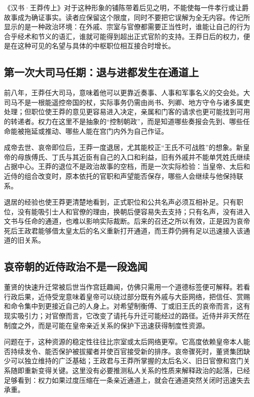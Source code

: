 《汉书·王莽传上》对于这种形象的铺陈带着后见之明，不能使每一件孝行或让爵故事成为确证事实。读者应保留这个限度，同时不要把它误解为全无内容。传记所显示的是一种政治环境：在外戚、宗室与官僚都需要正当性时，谁能让自己的行为合乎经术和节义的语汇，谁就可能得到超出正式官阶的支持。王莽日后的权力，便是在这种可见的名望与具体的中枢职位相互接合时增长。

\subsection{第一次大司马任期：退与进都发生在通道上}

前八年，王莽任大司马，意味着他可以更靠近奏事、人事和军事名义的交会处。大司马不是一根能遥控帝国的杖，实际事务仍需由尚书、列卿、地方守令与诸多属吏处理；但职位使王莽的意见更容易进入决定，亲属和门客的请求也更可能找到可用的转递者。权力在这里不是抽象的“控制朝政”，而是知道哪些奏报会先到、哪些任命能被拖延或推动、哪些人能在宫门内外为自己作证。

成帝去世、哀帝即位后，王莽一度退居，尤其能校正“王氏不可战胜”的想象。新皇帝的母族傅氏、丁氏与其近臣有自己的入口和利益，旧有外戚并不能单凭姓氏继续占据中心。王莽的退位不是政治故事的空档，而是一次实际检验：当皇帝、太后和近侍的组合改变时，原本依托的官职和声望能否保存，哪些人会继续与他保持联系。

退居的经验也使王莽更清楚地看到，正式职位和公共名声必须互相补足。只有职位，没有能吸引士人和官僚的理由，换朝后便容易失去支持；只有名声，没有进入文书与任命的通道，也难以影响实际裁断。后来的召还之所以有效，正是因为哀帝死后王政君能够借太皇太后的名义重新打开通道，而王莽仍拥有足以迅速接入该通道的旧关系。

\subsection{哀帝朝的近侍政治不是一段逸闻}

董贤的快速升迁常被后世当作宫廷趣闻，仿佛只需用一个道德标签便可解释。若看行政后果，近侍受宠意味着皇帝可以绕过部分既有外戚与大臣网络，把信任、赏赐和命令集中到更接近自己的人身上。对希望制衡傅、丁或旧王氏的哀帝而言，这有现实吸引力；对官僚而言，它改变了请托与升迁可能经过的路径。近侍并非天然在制度之外，而是可能在皇帝亲近关系的保护下迅速获得制度性资源。

问题在于，这种资源的稳定性往往比宗室或太后网络更窄。它高度依赖皇帝本人能否持续发令、能否保护被拔擢者并使百官接受新的排序。哀帝骤死时，董贤集团缺少可以独立维持的广泛基础；王政君与王莽所掌握的太后名义、旧日官僚和宫门关系随即重新变得关键。这里没有必要推测私人关系的性质来解释政治的起落，已经足够看到：权力如果过度压缩在一条亲近通道上，就会在通道突然关闭时迅速失去承重。

